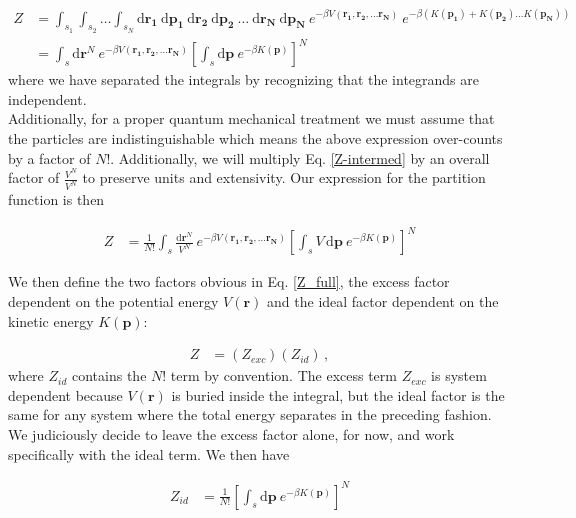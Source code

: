 \documentclass[12pt]{article}
\newcommand*{\diff}{\mathrm{d}}
\begin{document}
\begin{align}
    Z &= \int_{s_1} \int_{s_2} \dots \int_{s_N} \diff\mathbf{r_1}~ \diff\mathbf{p_1} ~\diff\mathbf{r_2} ~\diff\mathbf{p_2} ~\dots ~\diff\mathbf{r_N}~ \diff\mathbf{p_N} ~e^{-\beta V(\mathbf{r_1}, \mathbf{r_2}, \dots \mathbf{r_N})}~e^{-\beta(K(\mathbf{p_1}) + K(\mathbf{p_2}) ... K(\mathbf{p_N}))}\\
    &= \int_s \diff\mathbf{r}^N ~e^{-\beta V(\mathbf{r_1}, \mathbf{r_2}, \dots \mathbf{r_N})} \left[\int_s \diff\mathbf{p}~e^{-\beta K(\mathbf{p})}\right]^{N}
    \label{Z-intermed}
\end{align}
where we have separated the integrals by recognizing that the integrands are independent.\\
Additionally, for a proper quantum mechanical treatment we must assume that the particles are indistinguishable which means the above expression over-counts by a factor of $N!$. Additionally, we will multiply Eq. \ref{Z-intermed} by an overall factor of $\frac{V^N}{V^N}$ to preserve units and extensivity. Our expression for the partition function is then 

\begin{align}
    Z &= \frac{1}{ N!}\int_s \frac{\diff\mathbf{r}^N}{V^N} ~e^{-\beta V(\mathbf{r_1}, \mathbf{r_2}, \dots \mathbf{r_N})} \left[\int_s V\,\diff\mathbf{p}~e^{-\beta K(\mathbf{p})}\right]^{N}
    \label{Z_full}
\end{align}

We then define the two factors obvious in Eq. \ref{Z_full}, the excess factor dependent on the potential energy $V(\mathbf{r})$ and the ideal factor dependent on the kinetic energy $K(\mathbf{p})$: 

\begin{align}
    Z &= (Z_{exc})(Z_{id}) \,,
\end{align}
where $Z_{id}$ contains the $N!$ term by convention. The excess term $Z_{exc}$ is system dependent because $V(\mathbf{r})$ is buried inside the integral, but the ideal factor is the same for any system where the total energy separates in the preceding fashion. We judiciously decide to leave the excess factor alone, for now, and work specifically with the ideal term. We then have

\begin{align}
    Z_{id} &=  \frac{1}{N!}\left[\int_s \diff\mathbf{p} ~e^{-\beta K(\mathbf{p})}\right]^{N}
\end{align}
\end{document}
